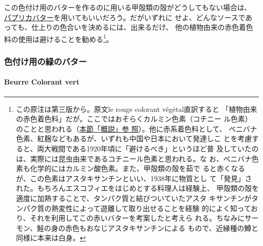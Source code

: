 \begin{recette}
この色付け用のバターを作るのに用いる甲殻類の殻がどうしてもない場合は、
\protect\hyperlink{beurre-de-paprika}{パプリカバター}を用いてもいいだろう。だがいずれに
せよ、どんなソースであっても、仕上りの色合いを決めるには、出来るだけ、
他の植物由来の赤色着色料の使用は避けることを勧める\footnote{この原注は第三版から。原文le
  rouge colorant végétal直訳すると
  「植物由来の赤色着色料」だが。ここではおそらくカルミン色素（コチニー
  ル色素）のことと思われる（\protect\hyperlink{observation-sur-les-beurres-composes}{本節「概説」参
  照}）。他に赤系着色料として、
  ベニバナ色素、紅麹などもあるが、いずれも中国や日本において発達しこ
  とを考慮すると、両大戦間である1920年頃に「避けるべき」というほど普
  及していたのは、実際には昆虫由来であるコチニール色素と思われる。な
  お、ベニバナ色素も化学的にはカルミン酸色素。また、甲殻類の殻を茹で
  ると赤くなるが、この色素はアスタキサンチンといい、1938年に物質とし
  て「発見」された。もちろんエスコフィエをはじめとする料理人は経験上、
  甲殻類の殻を適度に加熱することで、タンパク質と結びついていたアスタ
  キサンチンがタンパク質の熱変性によって遊離して取り出せることを経験
  的によく知っており、それを利用してこの赤いバターを考案したと考えら
  れる。ちなみにサーモン、鮭の身の赤色もおなじアスタキサンチンによる
  もので、近縁種の鱒と同様に本来は白身。}。

\maeaki

\hypertarget{ux8272ux4ed8ux3051ux7528ux306eux7dd1ux306eux30d0ux30bfux30fc}{%
\subsubsection{色付け用の緑のバター}\label{ux8272ux4ed8ux3051ux7528ux306eux7dd1ux306eux30d0ux30bfux30fc}}

\hypertarget{beurre-colorant-vert}{%
\paragraph{Beurre Colorant vert}\label{beurre-colorant-vert}}



\end{recette}

